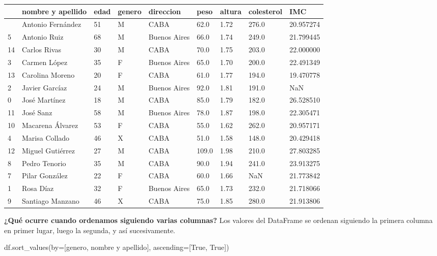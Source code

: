 \documentclass[
  letterpaper,
  DIV=11,
  numbers=noendperiod]{scrreprt}
\newenvironment{Shaded}{\begin{snugshade}}{\end{snugshade}}
\newcommand{\NormalTok}[1]{\textcolor[rgb]{0.00,0.23,0.31}{#1}}
\newcommand{\OperatorTok}[1]{\textcolor[rgb]{0.37,0.37,0.37}{#1}}
\newcommand{\StringTok}[1]{\textcolor[rgb]{0.13,0.47,0.30}{#1}}
\newcommand{\VariableTok}[1]{\textcolor[rgb]{0.07,0.07,0.07}{#1}}
\begin{document}
\begin{longtable}[]{@{}lllllllll@{}}
\toprule\noalign{}
& nombre y apellido & edad & genero & direccion & peso & altura &
colesterol & IMC \\
\midrule\noalign{}
\endhead
\bottomrule\noalign{}
\endlastfoot
6 & Antonio Fernández & 51 & M & CABA & 62.0 & 1.72 & 276.0 &
20.957274 \\
5 & Antonio Ruiz & 68 & M & Buenos Aires & 66.0 & 1.74 & 249.0 &
21.799445 \\
14 & Carlos Rivas & 30 & M & CABA & 70.0 & 1.75 & 203.0 & 22.000000 \\
3 & Carmen López & 35 & F & Buenos Aires & 65.0 & 1.70 & 200.0 &
22.491349 \\
13 & Carolina Moreno & 20 & F & CABA & 61.0 & 1.77 & 194.0 &
19.470778 \\
2 & Javier Garcíaz & 24 & M & Buenos Aires & 92.0 & 1.81 & 191.0 &
NaN \\
0 & José Martínez & 18 & M & CABA & 85.0 & 1.79 & 182.0 & 26.528510 \\
11 & José Sanz & 58 & M & Buenos Aires & 78.0 & 1.87 & 198.0 &
22.305471 \\
10 & Macarena Álvarez & 53 & F & CABA & 55.0 & 1.62 & 262.0 &
20.957171 \\
4 & Marisa Collado & 46 & X & CABA & 51.0 & 1.58 & 148.0 & 20.429418 \\
12 & Miguel Gutiérrez & 27 & M & CABA & 109.0 & 1.98 & 210.0 &
27.803285 \\
8 & Pedro Tenorio & 35 & M & CABA & 90.0 & 1.94 & 241.0 & 23.913275 \\
7 & Pilar González & 22 & F & CABA & 60.0 & 1.66 & NaN & 21.773842 \\
1 & Rosa Díaz & 32 & F & Buenos Aires & 65.0 & 1.73 & 232.0 &
21.718066 \\
9 & Santiago Manzano & 46 & X & CABA & 75.0 & 1.85 & 280.0 &
21.913806 \\
\end{longtable}

\textbf{¿Qué ocurre cuando ordenamos siguiendo varias columnas?} Los
valores del DataFrame se ordenan siguiendo la primera columna en primer
lugar, luego la segunda, y así sucesivamente.

\begin{Shaded}
\begin{Highlighting}[]
\NormalTok{df.sort\_values(by}\OperatorTok{=}\NormalTok{[}\StringTok{\textquotesingle{}genero\textquotesingle{}}\NormalTok{, }\StringTok{\textquotesingle{}nombre y apellido\textquotesingle{}}\NormalTok{], ascending}\OperatorTok{=}\NormalTok{[}\VariableTok{True}\NormalTok{, }\VariableTok{True}\NormalTok{])}
\end{Highlighting}
\end{Shaded}
\end{document}
